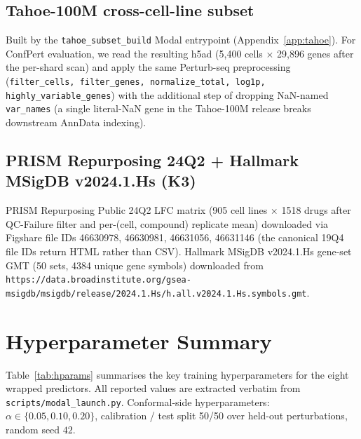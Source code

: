 \documentclass{article}
\begin{document}
\subsection{Tahoe-100M cross-cell-line subset}
Built by the \texttt{tahoe\_subset\_build} Modal entrypoint (Appendix~\ref{app:tahoe}). For ConfPert evaluation, we read the resulting h5ad (5,400 cells $\times$ 29,896 genes after the per-shard scan) and apply the same Perturb-seq preprocessing (\texttt{filter\_cells, filter\_genes, normalize\_total, log1p, highly\_variable\_genes}) with the additional step of dropping NaN-named \texttt{var\_names} (a single literal-NaN gene in the Tahoe-100M release breaks downstream AnnData indexing).

\subsection{PRISM Repurposing 24Q2 + Hallmark MSigDB v2024.1.Hs (K3)}
PRISM Repurposing Public 24Q2 LFC matrix (905 cell lines $\times$ 1518 drugs after QC-Failure filter and per-(cell, compound) replicate mean) downloaded via Figshare file IDs 46630978, 46630981, 46631056, 46631146 (the canonical 19Q4 file IDs return HTML rather than CSV). Hallmark MSigDB v2024.1.Hs gene-set GMT (50 sets, 4384 unique gene symbols) downloaded from \texttt{https://data.broadinstitute.org/gsea-msigdb/msigdb/release/2024.1.Hs/h.all.v2024.1.Hs.symbols.gmt}.

\section{Hyperparameter Summary}
\label{app:hparams}

Table~\ref{tab:hparams} summarises the key training hyperparameters for the eight wrapped predictors. All reported values are extracted verbatim from \texttt{scripts/modal\_launch.py}. Conformal-side hyperparameters: $\alpha \in \{0.05, 0.10, 0.20\}$, calibration / test split 50/50 over held-out perturbations, random seed $42$.
\end{document}
